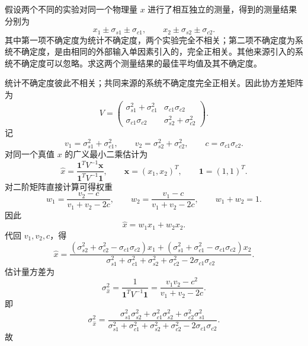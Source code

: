 \begin{question}
假设两个不同的实验对同一个物理量 $x$ 进行了相互独立的测量，得到的测量结果分别为
\[
x_1\pm\sigma_{s1}\pm\sigma_{c1},
\qquad
x_2\pm\sigma_{s2}\pm\sigma_{c2}.
\]
其中第一项不确定度为统计不确定度，两个实验完全不相关；第二项不确定度为系统不确定度，是由相同的外部输入单因素引入的，完全正相关。其他来源引入的系统不确定度可以忽略。求这两个测量结果的最佳平均值及其不确定度。
\begin{solution}
统计不确定度彼此不相关；共同来源的系统不确定度完全正相关。因此协方差矩阵为
\[
V=\begin{pmatrix}
\sigma_{s1}^2+\sigma_{c1}^2 & \sigma_{c1}\sigma_{c2}\\
\sigma_{c1}\sigma_{c2} & \sigma_{s2}^2+\sigma_{c2}^2
\end{pmatrix}.
\]
记
\[
v_1=\sigma_{s1}^2+\sigma_{c1}^2,
\qquad
v_2=\sigma_{s2}^2+\sigma_{c2}^2,
\qquad
c=\sigma_{c1}\sigma_{c2}.
\]
对同一个真值 $x$ 的广义最小二乘估计为
\[
\hat x=\frac{\mathbf 1^{T}V^{-1}\mathbf x}{\mathbf 1^{T}V^{-1}\mathbf 1},
\qquad
\mathbf x=(x_1,x_2)^T,
\qquad
\mathbf 1=(1,1)^T.
\]
对二阶矩阵直接计算可得权重
\[
w_1=\frac{v_2-c}{v_1+v_2-2c},
\qquad
w_2=\frac{v_1-c}{v_1+v_2-2c},
\qquad
w_1+w_2=1.
\]
因此
\[
\hat x=w_1x_1+w_2x_2.
\]
代回 $v_1,v_2,c$，得
\[
\hat x=\frac{(\sigma_{s2}^2+\sigma_{c2}^2-\sigma_{c1}\sigma_{c2})x_1
+(\sigma_{s1}^2+\sigma_{c1}^2-\sigma_{c1}\sigma_{c2})x_2}
{\sigma_{s1}^2+\sigma_{c1}^2+\sigma_{s2}^2+\sigma_{c2}^2-2\sigma_{c1}\sigma_{c2}}.
\]
估计量方差为
\[
\sigma_{\hat x}^2=\frac{1}{\mathbf 1^{T}V^{-1}\mathbf 1}
=\frac{v_1v_2-c^2}{v_1+v_2-2c}.
\]
即
\[
\sigma_{\hat x}^2
=\frac{\sigma_{s1}^2\sigma_{s2}^2+\sigma_{c1}^2\sigma_{s2}^2+\sigma_{c2}^2\sigma_{s1}^2}
{\sigma_{s1}^2+\sigma_{c1}^2+\sigma_{s2}^2+\sigma_{c2}^2-2\sigma_{c1}\sigma_{c2}}.
\]
故
\end{solution}
\end{question}

